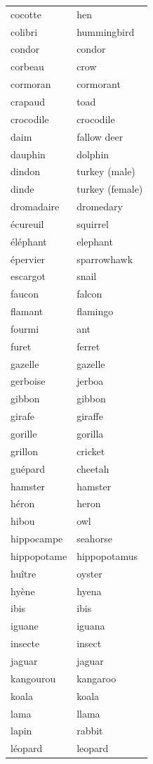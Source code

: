 \documentclass[12pt,a4paper]{article}
\begin{document}
\begin{longtable}{p{4cm} p{6cm}}
cocotte & hen \\
colibri & hummingbird \\
condor & condor \\
corbeau & crow \\
cormoran & cormorant \\
crapaud & toad \\
crocodile & crocodile \\
daim & fallow deer \\
dauphin & dolphin \\
dindon & turkey (male) \\
dinde & turkey (female) \\
dromadaire & dromedary \\
écureuil & squirrel \\
éléphant & elephant \\
épervier & sparrowhawk \\
escargot & snail \\
faucon & falcon \\
flamant & flamingo \\
fourmi & ant \\
furet & ferret \\
gazelle & gazelle \\
gerboise & jerboa \\
gibbon & gibbon \\
girafe & giraffe \\
gorille & gorilla \\
grillon & cricket \\
guépard & cheetah \\
hamster & hamster \\
héron & heron \\
hibou & owl \\
hippocampe & seahorse \\
hippopotame & hippopotamus \\
huître & oyster \\
hyène & hyena \\
ibis & ibis \\
iguane & iguana \\
insecte & insect \\
jaguar & jaguar \\
kangourou & kangaroo \\
koala & koala \\
lama & llama \\
lapin & rabbit \\
léopard & leopard \\

\end{longtable}
\end{document}

